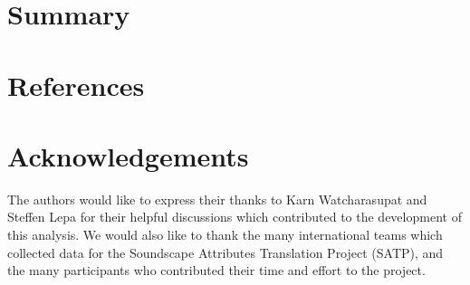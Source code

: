 \documentclass[
  authoryear,
  preprint,
  3p]{elsarticle}
\begin{document}
\section{Summary}\label{summary}

\section{References}\label{references}

\section*{Acknowledgements}\label{acknowledgements}

The authors would like to express their thanks to Karn Watcharasupat and
Steffen Lepa for their helpful discussions which contributed to the
development of this analysis. We would also like to thank the many
international teams which collected data for the Soundscape Attributes
Translation Project (SATP), and the many participants who contributed
their time and effort to the project.


  
\end{document}
